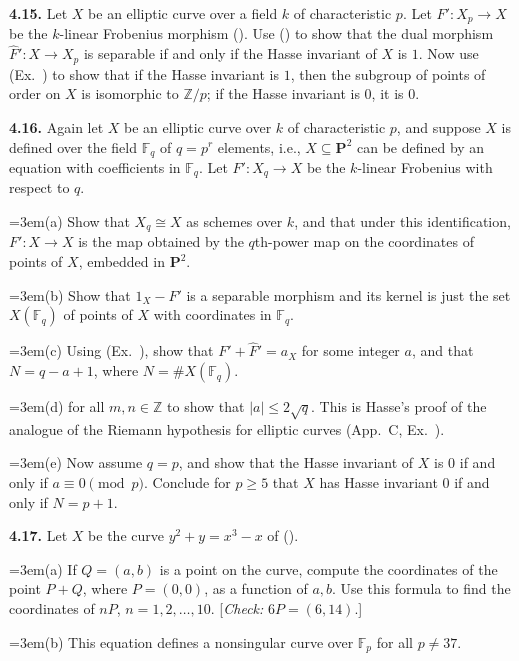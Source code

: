 {\smallskip
\noindent\hypertarget{ex-IV-4.15}{}\textbf{4.15.} Let $X$ be an elliptic curve over a field $k$ of characteristic $p$. Let $F'\colon X_p\to X$ be the $k$-linear Frobenius morphism (). Use () to show that the dual morphism $\widehat F'\colon X\to X_p$ is separable if and only if the Hasse invariant of $X$ is $1$. Now use (Ex.~) to show that if the Hasse invariant is $1$, then the subgroup of points of order  on $X$ is isomorphic to $\mathbb Z/p$; if the Hasse invariant is $0$, it is $0$.

\smallskip
\noindent\hypertarget{ex-IV-4.16}{}\textbf{4.16.} Again let $X$ be an elliptic curve over $k$ of characteristic $p$, and suppose $X$ is defined over the field $\mathbb F_q$ of $q=p^r$ elements, i.e., $X\subseteq\mathbf P^2$ can be defined by an equation with coefficients in $\mathbb F_q$.  Let $F'\colon X_q\to X$ be the $k$-linear Frobenius with respect to $q$.

\noindent\hangindent=3em\hspace*{1.7em}(a) Show that $X_q\cong X$ as schemes over $k$, and that under this identification, $F'\colon X\to X$ is the map obtained by the $q$th-power map on the coordinates of points of $X$, embedded in $\mathbf P^2$.

\noindent\hangindent=3em\hspace*{1.7em}(b) Show that $1_X-F'$ is a separable morphism and its kernel is just the set $X(\mathbb F_q)$ of points of $X$ with coordinates in $\mathbb F_q$.

\noindent\hangindent=3em\hspace*{1.7em}(c) Using (Ex.~), show that $F'+\widehat F'=a_X$ for some integer $a$, and that $N=q-a+1$, where $N=\#X(\mathbb F_q)$.

\noindent\hangindent=3em\hspace*{1.7em}\hypertarget{ex-IV-4.16d}{}(d)  for all $m,n\in\mathbb Z$ to show that $|a|\le2\sqrt q$. This is Hasse's proof of the analogue of the Riemann hypothesis for elliptic curves (App.~C, Ex.~).

\noindent\hangindent=3em\hspace*{1.7em}(e) Now assume $q=p$, and show that the Hasse invariant of $X$ is $0$ if and only if $a\equiv0\pmod p$. Conclude for $p\ge5$ that $X$ has Hasse invariant $0$ if and only if $N=p+1$.

\smallskip
\noindent\hypertarget{ex-IV-4.17}{}\textbf{4.17.} Let $X$ be the curve $y^2+y=x^3-x$ of ().

\noindent\hangindent=3em\hspace*{1.7em}(a) If $Q=(a,b)$ is a point on the curve, compute the coordinates of the point $P+Q$, where $P=(0,0)$, as a function of $a,b$. Use this formula to find the coordinates of $nP$, $n=1,2,\ldots,10$. [\emph{Check:} $6P=(6,14)$.]

\noindent\hangindent=3em\hspace*{1.7em}(b) This equation defines a nonsingular curve over $\mathbb F_p$ for all $p\ne37$.}
